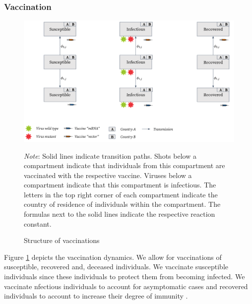 \subsubsection{Vaccination}
\begin{figure}[h!]
\centering
\includegraphics[scale=0.3]{images/overview_vaccination.png}\\
\begin{flushleft}
\scriptsize{\textit{Note}: Solid lines indicate transition paths. Shots below a compartment indicate that individuals from this compartment are vaccinated with the respective vaccine. Viruses below a compartment indicate that this compartment is infectious. The letters in the top right corner of each compartment indicate the country of residence of individuals within the compartment. The formulas next to the solid lines indicate the respective reaction constant.}
\end{flushleft}
\caption{Structure of vaccinations}
\label{fig:model_vaccination_ov}
\end{figure}
Figure \ref{fig:model_vaccination_ov} depicts the vaccination dynamics. We allow for vaccinations of susceptible, recovered and, deceased individuals. We vaccinate susceptible individuals since these individuals to protect them from becoming infected. We vaccinate nfectious individuals to account for asymptomatic cases \citep{Byambasuren.2020} and recovered individuals to account to increase their degree of immunity \citep{Skelly.2021}. \\


